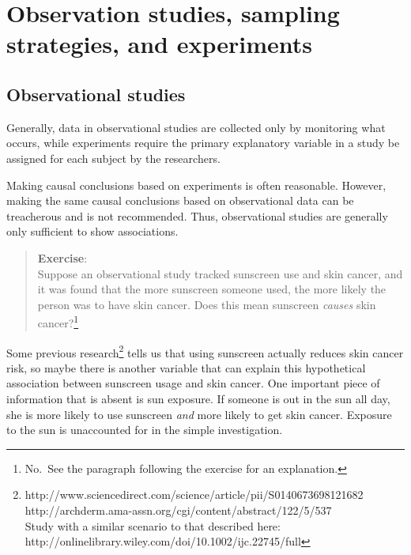 \documentclass[
  letterpaper,
  DIV=11,
  numbers=noendperiod]{scrreprt}
\begin{document}
\section{Observation studies, sampling strategies, and
experiments}\label{observation-studies-sampling-strategies-and-experiments}

\subsection{Observational studies}\label{observational-studies}

Generally, data in observational studies are collected only by
monitoring what occurs, while experiments require the primary
explanatory variable in a study be assigned for each subject by the
researchers.

Making causal conclusions based on experiments is often reasonable.
However, making the same causal conclusions based on observational data
can be treacherous and is not recommended. Thus, observational studies
are generally only sufficient to show associations.

\begin{quote}
\textbf{Exercise}:\\
Suppose an observational study tracked sunscreen use and skin cancer,
and it was found that the more sunscreen someone used, the more likely
the person was to have skin cancer. Does this mean sunscreen
\emph{causes} skin cancer?\footnote{No.~See the paragraph following the
  exercise for an explanation.}
\end{quote}

Some previous research\footnote{http://www.sciencedirect.com/science/article/pii/S0140673698121682\\
  http://archderm.ama-assn.org/cgi/content/abstract/122/5/537\\
  Study with a similar scenario to that described here:\\
  http://onlinelibrary.wiley.com/doi/10.1002/ijc.22745/full} tells us
that using sunscreen actually reduces skin cancer risk, so maybe there
is another variable that can explain this hypothetical association
between sunscreen usage and skin cancer. One important piece of
information that is absent is sun exposure. If someone is out in the sun
all day, she is more likely to use sunscreen \emph{and} more likely to
get skin cancer. Exposure to the sun is unaccounted for in the simple
investigation.
\end{document}
